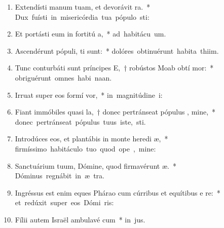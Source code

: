 \begin{flushleft}
\begin{enumerate}[leftmargin=*]
\item Extendísti manum tuam, et devorávit  ra.~* \mbox{Dux fuísti in misericórdia tua pópulo  sti:}
\item Et portásti eum in fortitú a,~* \mbox{ad habitácu  um.}
\item Ascendérunt pópuli,  ti sunt:~* \mbox{dolóres obtinuérunt habita thiim.}
\item Tunc conturbáti sunt príncipes E,~† robústos Moab obtí mor:~* \mbox{obriguérunt omnes habi naan.}
\item Irruat super eos formí  vor,~* \mbox{in magnitúdine  i:}
\item Fiant immóbiles quasi la,~† donec pertránseat pópulus , mine,~* \mbox{donec pertránseat pópulus tuus iste,  sti.}
\item Introdúces eos, et plantábis in monte heredi æ,~* \mbox{firmíssimo habitáculo tuo quod ope , mine:}
\item Sanctuárium tuum, Dómine, quod firmavérunt  æ.~* \mbox{Dóminus regnábit in æ  tra.}
\item Ingréssus est enim eques Phárao cum cúrribus et equítibus e  re:~* \mbox{et redúxit super eos Dómi  ris:}
\item Fílii autem Israël ambulavé  cum~* \mbox{in  jus.}




\end{enumerate}
\end{flushleft}

